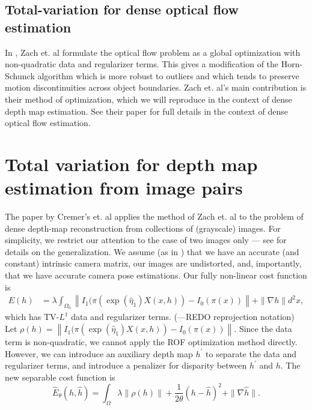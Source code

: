 \documentclass[conference]{IEEEtran}
\begin{document}
\subsection{Total-variation for dense optical flow estimation}
In \cite{tv_optical_flow}, Zach et. al formulate the optical flow problem \cite{optical_flow_reference}
as a global optimization with non-quadratic data and regularizer terms. This gives a modification
of the Horn-Schunck algorithm which is more robust to outliers and which tends to preserve motion discontinuities across object boundaries.
Zach et. al's main contribution is their method of optimization,
which we will reproduce in the context of dense depth map estimation.
See their paper \cite{tv_optical_flow} for full details in the context of dense optical flow estimation.

\section{Total variation for depth map estimation from image pairs}
The paper by Cremer's et. al \cite{dense_geometry} applies the method of Zach et. al \cite{tv_optical_flow} to
the problem of dense depth-map
reconstruction from collections of (grayscale) images. For simplicity, we restrict our attention to the case of two images only ---
see \cite{dense_geometry} for details on the generalization. We assume (as in \cite{dense_geometry}) that we have an accurate (and constant) intrinsic camera matrix,
our images are undistorted, and, importantly, that we have accurate camera pose estimations.
Our fully non-linear cost function is
\begin{equation}
\begin{split}
E(h) &= \lambda \int_{\Omega_0}\left\|I_1(\pi(\exp(\hat{\eta}_1)X(x,h)) - I_0(\pi(x))\right\|
     + \|\nabla h\| d^2 x,
\end{split}
\end{equation}
which has TV-$L^1$ \cite{tv_optical_flow} data and regularizer terms.
(---REDO reprojection notation)
Let $\rho(h) = \left\|I_1(\pi(\exp(\hat{\eta}_1)X(x,h)) - I_0(\pi(x))\right\|$. Since the data term is non-quadratic, we
cannot apply the ROF optimization method directly. However, we can introduce
an auxiliary depth map $h^\prime$ to separate the data and regularizer terms,
and introduce a penalizer for disparity between $h^\prime$ and $h$. The
new separable cost function is
\begin{equation}\label{separable_cost}
    \hat{E}_\theta(h, \hat{h}) = \int_\Omega \lambda \|\rho(h)\| + \frac{1}{2\theta}(h - \hat{h})^2 + \|\nabla \hat{h}\|.
\end{equation}
\end{document}

